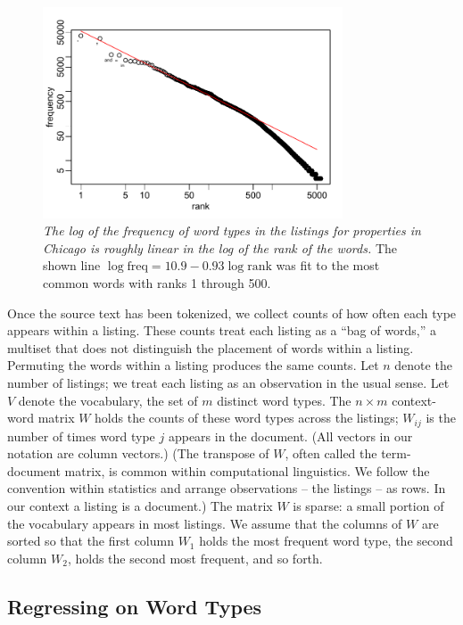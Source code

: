 \documentclass[12pt]{article}
\begin{document}
 \begin{figure}
 \caption{ \label{fig:zipf} { \sl The log of the frequency of word types in the
 listings for properties in Chicago is roughly linear in the log of the rank of
 the words.}  The shown line $\log \mbox{freq} = 10.9 - 0.93 \log \mbox{rank}$ 
 was fit to the most common words with ranks 1 through 500.  }

 \centerline{
 \vspace{0.1in}
 \includegraphics[width=3.5in]{figures/zipf} }
 \vspace{0.2in}
 \end{figure}


 Once the source text has been tokenized, we collect counts of how often each
 type appears within a listing.  These counts treat each listing as a ``bag of
 words,'' a multiset that does not distinguish the placement of words within a
 listing.  Permuting the words within a listing produces the same counts.  Let
 $n$ denote the number of listings; we treat each listing as an observation in
 the usual sense.  Let $V$ denote the vocabulary, the set of $m$ distinct word
 types.  The $n \times m$ context-word matrix $W$ holds the counts of these word
 types across the listings; $W_{ij}$ is the number of times word type $j$
 appears in the \ith document.  (All vectors in our notation are column
 vectors.)  (The transpose of $W$, often called the term-document matrix, is
 common within computational linguistics. We follow the convention within
 statistics and arrange observations -- the listings -- as rows. In our context
 a listing is a document.)  The matrix $W$ is sparse: a small portion of the
 vocabulary appears in most listings. We assume that the columns of $W$ are
 sorted so that the first column $W_1$ holds the most frequent word type, the
 second column $W_2$, holds the second most frequent, and so forth.


\subsection{ Regressing on Word Types }  %
\end{document}

